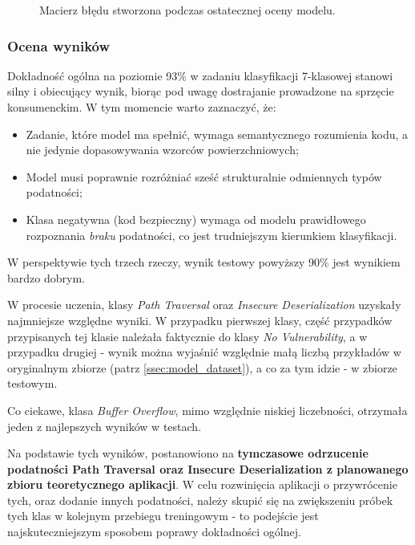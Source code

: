 \documentclass[12pt,a4paper]{article}
\begin{document}
\begin{figure}[H]
    
    \caption{Macierz błędu stworzona podczas ostatecznej oceny modelu.}
\end{figure}

\subsubsection{Ocena wyników}

Dokładność ogólna na poziomie 93\% w zadaniu klasyfikacji 7-klasowej stanowi silny i obiecujący wynik, biorąc pod uwagę dostrajanie prowadzone 
na sprzęcie konsumenckim. W tym momencie warto zaznaczyć, że:

\begin{itemize}
    \item Zadanie, które model ma spełnić, wymaga semantycznego rozumienia kodu, a nie jedynie dopasowywania wzorców powierzchniowych;
    \item Model musi poprawnie rozróżniać sześć strukturalnie odmiennych typów podatności;
    \item Klasa negatywna (kod bezpieczny) wymaga od modelu prawidłowego rozpoznania \textit{braku} podatności, co jest trudniejszym kierunkiem
    klasyfikacji.
\end{itemize}

W perspektywie tych trzech rzeczy, wynik testowy powyższy 90\% jest wynikiem bardzo dobrym.

W procesie uczenia, klasy \emph{Path Traversal} oraz \emph{Insecure Deserialization} uzyskały najmniejsze względne wyniki. W przypadku pierwszej klasy, 
część przypadków przypisanych tej klasie należała faktycznie do klasy \emph{No Vulnerability}, a w przypadku drugiej - wynik można wyjaśnić względnie małą liczbą
przykładów w oryginalnym zbiorze (patrz \ref{ssec:model_dataset}), a co za tym idzie - w zbiorze testowym. 

Co ciekawe, klasa \emph{Buffer Overflow}, mimo względnie niskiej liczebności, otrzymała jeden z najlepszych wyników w testach. 

Na podstawie tych wyników, postanowiono na \textbf{tymczasowe odrzucenie podatności Path Traversal oraz Insecure Deserialization z planowanego zbioru teoretycznego 
aplikacji}. W celu rozwinięcia aplikacji o przywrócenie tych, oraz dodanie innych podatności, należy skupić się na zwiększeniu próbek tych klas w kolejnym przebiegu 
treningowym - to podejście jest najskuteczniejszym sposobem poprawy dokładności ogólnej.
\end{document}
